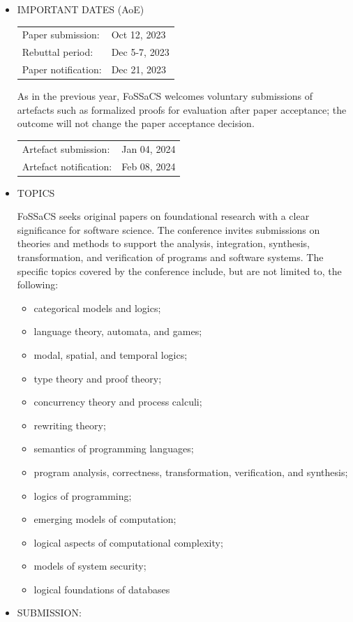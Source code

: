 \documentclass[prodmode,acmtecs]{acmsmall} %
\begin{document}
\begin{itemize}\item  IMPORTANT DATES (AoE) 
 
\begin{tabulary}{\linewidth}{LL}Paper submission:  & Oct 12, 2023 \\
Rebuttal period:  & Dec 5-7, 2023 \\
Paper notification:  & Dec 21, 2023 \\
\end{tabulary}
 
  As in the previous year, FoSSaCS welcomes voluntary submissions of artefacts such as formalized proofs for evaluation after paper acceptance; the outcome will not change the paper acceptance decision. 
 
\begin{tabulary}{\linewidth}{LL}Artefact submission:  & Jan 04, 2024 \\
Artefact notification:  & Feb 08, 2024 \\
\end{tabulary}
 
\item  TOPICS  
 
  FoSSaCS seeks original papers on foundational research with a clear significance for software science. The conference invites submissions on theories and methods to support the analysis, integration, synthesis, transformation, and verification of programs and software systems. The specific topics covered by the conference include, but are not limited to, the following: 
 
\begin{itemize}\item  categorical models and logics;
\item  language theory, automata, and games;
\item  modal, spatial, and temporal logics;
\item  type theory and proof theory;
\item  concurrency theory and process calculi;
\item  rewriting theory;
\item  semantics of programming languages;
\item  program analysis, correctness, transformation, verification, and synthesis;
\item  logics of programming;
\item  emerging models of computation;
\item  logical aspects of computational complexity;
\item  models of system security;
\item  logical foundations of databases
\end{itemize} 
\item  SUBMISSION: 
 

\end{itemize}
\end{document}
